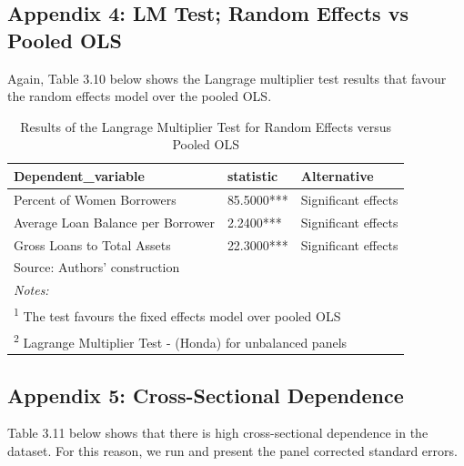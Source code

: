 \documentclass[a4paper, nobind]{templates/ociamthesis}
\begin{document}
\hypertarget{appendix-4-lm-test-random-effects-vs-pooled-ols}{%
\subsection{Appendix 4: LM Test; Random Effects vs Pooled OLS}\label{appendix-4-lm-test-random-effects-vs-pooled-ols}}

Again, Table 3.10 below shows the Langrage multiplier test results that favour the random effects model over the pooled OLS.

\begin{table}[!h]

\caption{\label{tab:unnamed-chunk-85}Results of the Langrage Multiplier Test for Random Effects versus Pooled OLS}
\centering
\fontsize{9}{11}\selectfont
\begin{tabular}[t]{lll}
\toprule
Dependent\_variable & statistic & Alternative\\
\midrule
Percent of Women Borrowers & 85.5000*** & Significant effects\\
Average Loan Balance per Borrower & 2.2400*** & Significant effects\\
Gross Loans to Total Assets & 22.3000*** & Significant effects\\
\bottomrule
\multicolumn{3}{l}{\rule{0pt}{1em}Source: Authors' construction}\\
\multicolumn{3}{l}{\rule{0pt}{1em}\textit{Notes: }}\\
\multicolumn{3}{l}{\rule{0pt}{1em}\textsuperscript{1} The test favours the fixed effects model over pooled OLS}\\
\multicolumn{3}{l}{\rule{0pt}{1em}\textsuperscript{2} Lagrange Multiplier Test - (Honda) for unbalanced panels}\\
\end{tabular}
\end{table}

\hypertarget{appendix-5-cross-sectional-dependence}{%
\subsection{Appendix 5: Cross-Sectional Dependence}\label{appendix-5-cross-sectional-dependence}}

Table 3.11 below shows that there is high cross-sectional dependence in the dataset. For this reason, we run and present the panel corrected standard errors.
\end{document}
